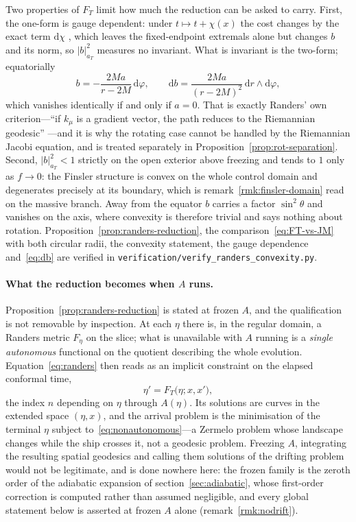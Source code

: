 \documentclass[12pt]{iopart}
\theoremstyle{plain}
\theoremstyle{definition}
\theoremstyle{remark}
\newcommand{\dd}{\mathrm{d}}
\begin{document}
Two properties of $F_T$ limit how much the reduction can be asked to carry.
First, the one-form is gauge dependent: under $t\mapsto t+\chi(x)$ the cost
changes by the exact term $\dd\chi$ \cite[p.~3151]{Perlick1991}, which leaves the
fixed-endpoint extremals alone but changes $b$ and its norm, so $|b|^2_{a_T}$
measures no invariant. What is invariant is the two-form; equatorially
\begin{equation}
    b=-\frac{2Ma}{r-2M}\,\dd\varphi ,
    \qquad
    \dd b=\frac{2Ma}{(r-2M)^2}\,\dd r\wedge\dd\varphi ,
    \label{eq:db}
\end{equation}
which vanishes identically if and only if $a=0$. That is exactly Randers' own
criterion---``if $k_\mu$ is a gradient vector, the path reduces to the Riemannian
geodesic'' \cite[Eqs.~(13)--(14)]{Randers1941}---and it is why the rotating case
cannot be handled by the Riemannian Jacobi equation, and is treated separately in
Proposition~\ref{prop:rot-separation}. Second, $|b|^2_{a_T}<1$ strictly on the
open exterior above freezing and tends to $1$ only as $f\to0$: the Finsler
structure is convex on the whole control domain and degenerates precisely at its
boundary, which is remark~\ref{rmk:finsler-domain} read on the massive branch.
Away from the equator $b$ carries a factor $\sin^2\theta$ and vanishes on the
axis, where convexity is therefore trivial and says nothing about rotation.
Proposition~\ref{prop:randers-reduction}, the comparison~\eqref{eq:FT-vs-JM}
with both circular radii, the convexity statement, the gauge dependence
and~\eqref{eq:db} are verified in
\texttt{verification/verify\_randers\_convexity.py}.

\paragraph{What the reduction becomes when $A$ runs.} Proposition~\ref{prop:randers-reduction}
is stated at frozen $A$, and the qualification is not removable by inspection.
At each $\eta$ there is, in the regular domain, a Randers metric $F_\eta$ on the
slice; what is unavailable with $A$ running is a \emph{single autonomous}
functional on the quotient describing the whole evolution.
Equation~\eqref{eq:randers} then reads as an implicit constraint on the elapsed
conformal time,
\begin{equation}
    \eta'=F_T\big(\eta;x,x'\big) ,
    \label{eq:nonautonomous}
\end{equation}
the index $n$ depending on $\eta$ through $A(\eta)$. Its solutions are curves in
the extended space $(\eta,x)$, and the arrival problem is the minimisation of the
terminal $\eta$ subject to~\eqref{eq:nonautonomous}---a Zermelo problem whose
landscape changes while the ship crosses it, not a geodesic problem. Freezing
$A$, integrating the resulting spatial geodesics and calling them solutions of
the drifting problem would not be legitimate, and is done nowhere here: the
frozen family is the zeroth order of the adiabatic expansion of
section~\ref{sec:adiabatic}, whose first-order correction is computed rather than
assumed negligible, and every global statement below is asserted at frozen $A$
alone (remark~\ref{rmk:nodrift}).
\end{document}
